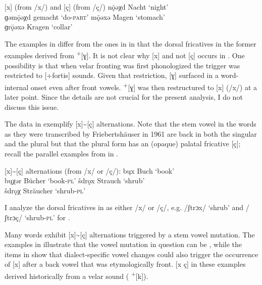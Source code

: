 \ea%
\label{ex:9:19} [x] (from /x/) and [ç] (from /ç/)
\ea\label{ex:9:19a}
nǭəχd   \tab [nɔːəçt]   \tab Nacht   \tab ‘night’ \\
ɡəmǭəχd \tab [gəmɔːəçt] \tab gemacht \tab ‘do-\textsc{part}’ 
\ex\label{ex:9:19b} 
mǭəxə  \tab [mɔːəxə]   \tab Magen   \tab ‘stomach’ \\
ɡrǭəxə \tab [grɔːəxə]  \tab Kragen  \tab ‘collar’  
  \z
\z 

The examples in  differ from the ones in  in that the dorsal fricatives in the former examples derived from  \textsuperscript{+}[ɣ]. It is not clear why [x] and not [ç] occurs in . One possibility is that when velar fronting was first phonologized the trigger was restricted to [+fortis] sounds. Given that restriction, [ɣ] surfaced in a word-internal onset even after front vowels.   \textsuperscript{+}[ɣ] was then restructured to [x] (/x/) at a later point. Since the details are not crucial for the present analysis, I do not discuss this issue.

The data in  exemplify [x]{\textasciitilde}[ç] alternations. Note that the stem vowel in the words as they were transcribed by Friebertshäuser in 1961 are back in both the singular and the plural but that the plural form has an (opaque) palatal fricative [ç]; recall the parallel examples from  in .

\ea%
\label{ex:9:20} [x]{\textasciitilde}[ç] alternations (from /x/ or /ç/):
\ea\label{ex:9:20a} b\k{u}x   \tab [bʊx]   \tab Buch        \tab ‘book’   \\
    b\k{u}χər \tab [bʊçər] \tab Bücher      \tab ‘book-\textsc{pl}’  
\ex\label{ex:9:20b} šdrǫx     \tab [ʃtrɔx] \tab Strauch     \tab ‘shrub’  \\
    šdrǫχ     \tab [ʃtrɔç] \tab Sträucher \tab ‘shrub-\textsc{pl}’ 
   \z
\z 

I analyze the dorsal fricatives in  as either /x/ or /ç/, e.g.  /ʃtrɔx/ ‘shrub’ and /ʃtrɔç/ ‘shrub-\textsc{pl}’ for .

Many words exhibit [x]{\textasciitilde}[ç] alternations triggered by a stem vowel mutation. The examples in  illustrate that the vowel mutation in question can be , while the items in  show that dialect-specific vowel changes could also trigger the occurrence of [x] after a back vowel that was etymologically front. [x ç] in these examples derived historically from a velar sound ( \textsuperscript{+}[k]).

